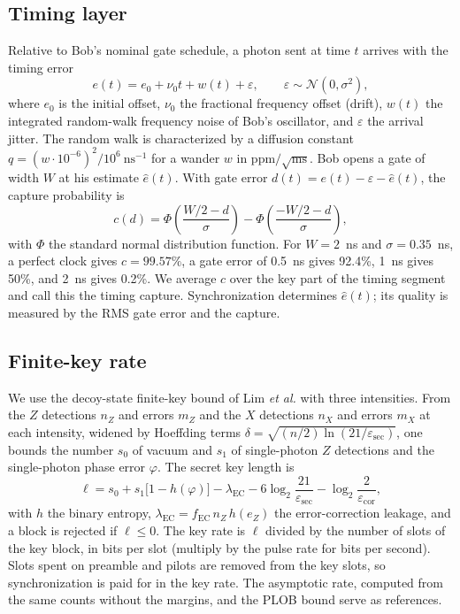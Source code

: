 \documentclass[journal]{IEEEtran}
\theoremstyle{plain}
\begin{document}
\subsection{Timing layer}
Relative to Bob's nominal gate schedule, a photon sent at time $t$ arrives with the timing error
\begin{equation}
e(t)=e_0+\nu_0 t+w(t)+\varepsilon, \qquad \varepsilon\sim\mathcal N(0,\sigma^2),
\label{eq:error}
\end{equation}
where $e_0$ is the initial offset, $\nu_0$ the fractional frequency offset (drift), $w(t)$ the integrated random-walk frequency noise of Bob's oscillator, and $\varepsilon$ the arrival jitter. The random walk is characterized by a diffusion constant $q=(w\cdot10^{-6})^2/10^{6}~\mathrm{ns}^{-1}$ for a wander $w$ in ppm$/\sqrt{\mathrm{ms}}$. Bob opens a gate of width $W$ at his estimate $\hat e(t)$. With gate error $d(t)=e(t)-\varepsilon-\hat e(t)$, the capture probability is
\begin{equation}
c(d)=\Phi\!\left(\frac{W/2-d}{\sigma}\right)-\Phi\!\left(\frac{-W/2-d}{\sigma}\right),
\label{eq:capture}
\end{equation}
with $\Phi$ the standard normal distribution function. For $W=2$~ns and $\sigma=0.35$~ns, a perfect clock gives $c=99.57\%$, a gate error of 0.5~ns gives 92.4\%, 1~ns gives 50\%, and 2~ns gives 0.2\%. We average $c$ over the key part of the timing segment and call this the timing capture. Synchronization determines $\hat e(t)$; its quality is measured by the RMS gate error and the capture.

\subsection{Finite-key rate}
We use the decoy-state finite-key bound of Lim \emph{et al.} \cite{lim2014} with three intensities. From the $Z$ detections $n_Z$ and errors $m_Z$ and the $X$ detections $n_X$ and errors $m_X$ at each intensity, widened by Hoeffding terms $\delta=\sqrt{(n/2)\ln(21/\varepsilon_{\mathrm{sec}})}$, one bounds the number $s_0$ of vacuum and $s_1$ of single-photon $Z$ detections and the single-photon phase error $\varphi$. The secret key length is
\begin{equation}
\ell = s_0 + s_1\big[1-h(\varphi)\big]-\lambda_{\mathrm{EC}}-6\log_2\frac{21}{\varepsilon_{\mathrm{sec}}}-\log_2\frac{2}{\varepsilon_{\mathrm{cor}}},
\label{eq:key}
\end{equation}
with $h$ the binary entropy, $\lambda_{\mathrm{EC}}=f_{\mathrm{EC}}\,n_Z\,h(e_Z)$ the error-correction leakage, and a block is rejected if $\ell\le0$. The key rate is $\ell$ divided by the number of slots of the key block, in bits per slot (multiply by the pulse rate for bits per second). Slots spent on preamble and pilots are removed from the key slots, so synchronization is paid for in the key rate. The asymptotic rate, computed from the same counts without the margins, and the PLOB bound \cite{plob2017} serve as references.
\end{document}
